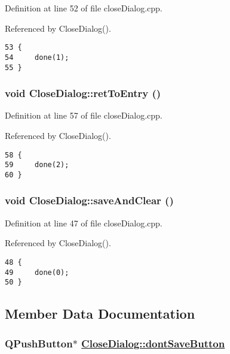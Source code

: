 Definition at line 52 of file close\-Dialog.cpp.

Referenced by Close\-Dialog().

\footnotesize\begin{verbatim}53 {
54     done(1);
55 }
\end{verbatim}\normalsize 


\hypertarget{classCloseDialog_k2}{
\subsubsection[retToEntry]{\setlength{\rightskip}{0pt plus 5cm}void Close\-Dialog::ret\-To\-Entry ()}}
\label{classCloseDialog_k2}


Definition at line 57 of file close\-Dialog.cpp.

Referenced by Close\-Dialog().

\footnotesize\begin{verbatim}58 {
59     done(2);
60 }
\end{verbatim}\normalsize 


\hypertarget{classCloseDialog_k0}{
\subsubsection[saveAndClear]{\setlength{\rightskip}{0pt plus 5cm}void Close\-Dialog::save\-And\-Clear ()}}
\label{classCloseDialog_k0}


Definition at line 47 of file close\-Dialog.cpp.

Referenced by Close\-Dialog().

\footnotesize\begin{verbatim}48 {
49     done(0);
50 }
\end{verbatim}\normalsize 




\subsection{Member Data Documentation}
\hypertarget{classCloseDialog_r4}{
\subsubsection[dontSaveButton]{\setlength{\rightskip}{0pt plus 5cm}QPush\-Button$\ast$ \hyperlink{classCloseDialog_r4}{Close\-Dialog::dont\-Save\-Button}}}
\label{classCloseDialog_r4}


